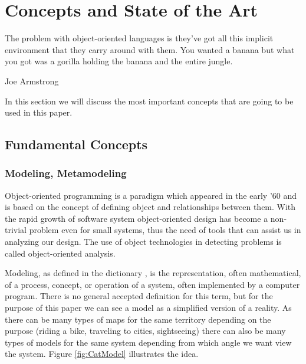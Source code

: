 \chapter{Concepts and State of the Art}\label{ch:2}

\epigraph{The problem with object-oriented languages is they've got all this
implicit environment that they carry around with them. You wanted a banana but what you got was a gorilla holding the banana and the entire jungle.}{Joe Armstrong}

In this section we will discuss the most important concepts that are going to
be used in this paper.


\section{Fundamental Concepts}

\subsection{Modeling, Metamodeling}\label{ch:2.1.1}


	Object-oriented programming is a paradigm which appeared in the
early '60 \cite{wiki:oop} and is based on the concept of defining object and
relationships between them. With the rapid growth of software system
object-oriented design has become a non-trivial problem even for small systems,
thus the need of tools that can assist us in analyzing our design. The use of
object technologies in detecting problems is called object-oriented analysis.

	Modeling, as defined in the dictionary \cite{dictionary:modeling}, is the
representation, often mathematical, of a process, concept, or operation of a system, 
often implemented by a computer program.  There is no general accepted
definition for this term, but for the purpose of this paper we can see a model
as a simplified version of a reality. As there can be many types of maps for the
same territory depending on the purpose (riding a bike, traveling to cities,
sightseeing) there can also be many types of models for the same system depending from which angle
we want view the system. Figure \ref{fig:CatModel} illustrates the idea.

